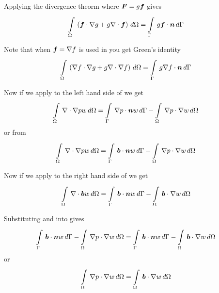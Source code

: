 Applying the divergence theorm where $\tensor{F}=g\vect{f}$ gives
\begin{equation}
  \gint{\Omega}{}{\pbrac{\dotprod{\vect{f}}{\gradient{g}}+g\diverg{\vect{f}}}}{\Omega}=\gint{\Gamma}{}{g\dotprod{\vect{f}}{\normal}}{\Gamma}
  \label{eqn:DivergenceTheormScalarVector}
\end{equation}

Note that when $\vect{f}=\gradient{f}$ is used in
 you get Green's identity \ie
\begin{equation}
  \gint{\Omega}{}{\pbrac{\dotprod{\gradient{f}}{\gradient{g}}+g\diverg{\gradient{f}}}}{\Omega}=\gint{\Gamma}{}{g\dotprod{\gradient{f}}{\normal}}{\Gamma}
  \label{eqn:GreensIdentity1}
\end{equation}

Now if we apply  to the left hand side of
 we get
\begin{equation}
  \gint{\Omega}{}{\diverg{\gradient{p}}w}{\Omega}=\gint{\Gamma}{}{\dotprod{\gradient{p}}{\normal}w}{\Gamma}-
  \gint{\Omega}{}{\dotprod{\gradient{p}}{\gradient{w}}}{\Omega}
\end{equation}
or from 
\begin{equation}
  \gint{\Omega}{}{\diverg{\gradient{p}}w}{\Omega}=\gint{\Gamma}{}{\dotprod{\vect{b}}{\normal}w}{\Gamma}-
  \gint{\Omega}{}{\dotprod{\gradient{p}}{\gradient{w}}}{\Omega}
  \label{eqn:PressurePoissonWeakFormLHS}
\end{equation}

Now if we apply  to the right hand
side of  we get
\begin{equation}
  \gint{\Omega}{}{\diverg{\vect{b}}w}{\Omega}=\gint{\Gamma}{}{\dotprod{\vect{b}}{\normal}w}{\Gamma}-
  \gint{\Omega}{}{\dotprod{\vect{b}}{\gradient{w}}}{\Omega}
  \label{eqn:PressurePoissonWeakFormRHS}
\end{equation}

Substituting  and
 into
 gives
\begin{equation}
  \gint{\Gamma}{}{\dotprod{\vect{b}}{\normal}w}{\Gamma}-
  \gint{\Omega}{}{\dotprod{\gradient{p}}{\gradient{w}}}{\Omega}=\gint{\Gamma}{}{\dotprod{\vect{b}}{\normal}w}{\Gamma}-
  \gint{\Omega}{}{\dotprod{\vect{b}}{\gradient{w}}}{\Omega}
\end{equation} 
or
\begin{equation}
  \gint{\Omega}{}{\dotprod{\gradient{p}}{\gradient{w}}}{\Omega}=\gint{\Omega}{}{\dotprod{\vect{b}}{\gradient{w}}}{\Omega}
  \label{eqn:PressurePoissonFinalWeakForm}
\end{equation}


